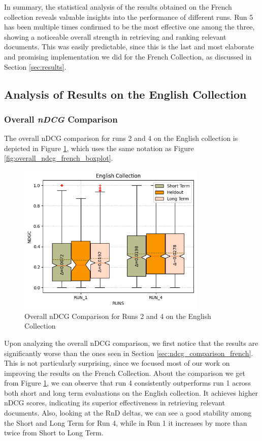 In summary, the statistical analysis of the results obtained on the French collection reveals valuable insights into the performance of different runs. 
Run 5 has been multiple times confirmed to be the most effective one among the three, showing a noticeable overall strength in retrieving and ranking relevant documents.
This was easily predictable, since this is the last and most elaborate and promising implementation we did for the French Collection, as discussed in Section \ref{sec:results}.   


\subsection{Analysis of Results on the English Collection}

\subsubsection{Overall \textit{nDCG} Comparison} \label{sec:ndcg_comparison_eng}

The overall \ac{nDCG} comparison for runs 2 and 4 on the English collection is depicted in Figure \ref{fig:overall_ndcg_eng}, which uses the same notation as Figure \ref{fig:overall_ndcg_french_boxplot}.

\begin{figure}[!h]
\centering
\includegraphics[width=0.8\textwidth]{figure/StatisticalAnalysis/nDCG_english_boxplot.png}
\caption{Overall nDCG Comparison for Runs 2 and 4 on the English Collection}
\label{fig:overall_ndcg_eng}
\end{figure}
 
Upon analyzing the overall \ac{nDCG} comparison, we first notice that the results are significantly worse than the ones seen in Section \ref{sec:ndcg_comparison_french}. 
This is not particularly surprising, since we focused most of our work on improving the results on the French Collection.  
About the comparison we get from Figure \ref{fig:overall_ndcg_eng}, we can observe that run 4 consistently outperforms run 1 across both short and long term evaluations on the English collection. 
It achieves higher \ac{nDCG} scores, indicating its superior effectiveness in retrieving relevant documents. 
Also, looking at the \ac{RnD} deltas, we can see a good stability among the Short and Long Term for Run 4, while in Run 1 it increases by more than twice from Short to Long Term.

